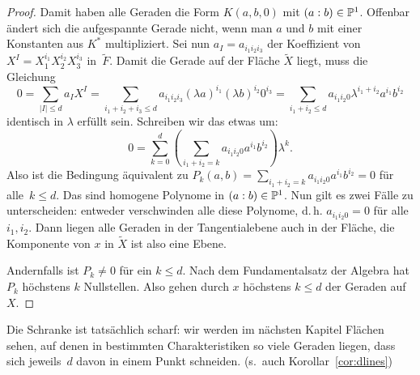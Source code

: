 \begin{proof}
Damit haben alle Geraden die Form $K(a,b,0)$ mit $(a:b) \in \mathbb P^{1}$. Offenbar ändert sich die aufgespannte Gerade nicht, wenn man $a$ und $b$ mit einer Konstanten aus $K^*$ multipliziert. Sei nun $a_I = a_{i_1 i_2 i_3}$ der Koeffizient von $X^I = X_1^{i_1} X_2^{i_2} X_3^{i_3}$ in~$\tilde F$. Damit die Gerade auf der Fläche $\tilde X$ liegt, muss die Gleichung
\begin{equation*}
0 = \sum_{|I| \leq d} a_I X^I = \sum_{i_1+i_2+i_3 \leq d} a_{i_1 i_2 i_3} (\lambda a)^{i_1} (\lambda b)^{i_2} 0^{i_3} = \sum_{i_1+i_2 \leq d} a_{i_1 i_2 0} \lambda^{i_1+i_2} a^{i_1} b^{i_2}
\end{equation*}
identisch in $\lambda$ erfüllt sein. Schreiben wir das etwas um:
\begin{equation*}
0 = \sum_{k=0}^d \left( \sum_{i_1+i_2 = k} a_{i_1 i_2 0} a^{i_1} b^{i_2} \right) \lambda^k.
\end{equation*}
Also ist die Bedingung äquivalent zu $P_k(a,b) = \sum_{i_1+i_2 = k} a_{i_1 i_2 0} a^{i_1} b^{i_2} = 0$ für alle~$k \leq d$. Das sind homogene Polynome in $(a:b) \in \mathbb P^{1}$. Nun gilt es zwei Fälle zu unterscheiden: entweder verschwinden alle diese Polynome, d.\,h. $a_{i_1 i_2 0} = 0$ für alle~$i_1, i_2$. Dann liegen alle Geraden in der Tangentialebene auch in der Fläche, die Komponente von $x$ in $\tilde X$ ist also eine Ebene.

Andernfalls ist $P_k \neq 0$ für ein $k \leq d$. Nach dem Fundamentalsatz der Algebra hat $P_k$ höchstens $k$ Nullstellen. Also gehen durch $x$ höchstens $k \leq d$ der Geraden auf $X$.
\end{proof}
\begin{remarks}
Die Schranke ist tatsächlich scharf: wir werden im nächsten Kapitel Flächen sehen, auf denen in bestimmten Charakteristiken so viele Geraden liegen, dass sich jeweils~$d$ davon in einem Punkt schneiden. (s.~auch Korollar~\ref{cor:dlines})
\end{remarks}
